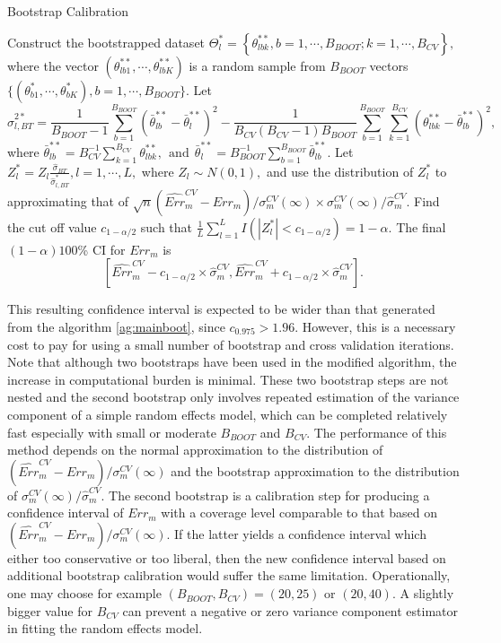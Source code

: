 \documentclass[12pt]{article}
\begin{document}
\begin{algorithm}[h!]
\caption{Bootstrap Calibration}\label{ag:calboot}
{\small
\begin{algorithmic}[1]
\setcounter{ALG@line}{12}
\State Construct the bootstrapped dataset
$\Theta_l^*=\left\{\theta^{**}_{lbk}, b=1,\cdots, B_{BOOT}; k=1, \cdots, B_{CV}\right\},$
where the vector  $(\theta^{**}_{lb1}, \cdots, \theta^{**}_{lbK})$ is a random sample from $B_{BOOT}$ vectors 
$\{(\theta^*_{b1}, \cdots, \theta^*_{bK}), b=1, \cdots, B_{BOOT}\}.$
\State Let
$$\hat{\sigma}_{l,BT}^{2*}=\frac{1}{B_{BOOT}-1}\sum_{b=1}^{B_{BOOT}} (\bar{\theta}^{**}_{lb}-\bar{\theta}^{**}_l)^2-\frac{1}{B_{CV}(B_{CV}-1)B_{BOOT}}\sum_{b=1}^{B_{BOOT}} \sum_{k=1}^{B_{CV}}(\theta^{**}_{lbk}-\bar{\theta}^{**}_{lb})^2,$$
where 
$\bar{\theta}_{lb}^{**}=B_{CV}^{-1}\sum_{k=1}^{B_{CV}} \theta^{**}_{lbk},~~\mbox{and}~~\bar{\theta}^{**}_l=B_{BOOT}^{-1}\sum_{b=1}^{B_{BOOT}} \bar{\theta}^{**}_{lb}.$
\EndFor
\State Let $Z_l^*=Z_l\frac{\widehat{\sigma}_{BT}}{\widehat{\sigma}_{l, BT}^{*}} , l=1, \cdots, L,$
where $Z_l\sim N(0, 1),$ and use the distribution of $Z_l^*$ to approximating that of  $\sqrt{n}(\widehat{Err}^{CV}_m-Err_m)/\sigma_m^{CV}(\infty) \times \sigma_{m}^{CV}(\infty)/\widehat{\sigma}_m^{CV}.$
\State Find the cut off value $c_{1-\alpha/2}$ such that $\frac{1}{L}\sum_{l=1}^L I\left(|Z_l^*|<c_{1-\alpha/2} \right)=1-\alpha.$
\State The final $(1-\alpha)100$\% CI for $Err_m$ is 
$$\left[\widehat{Err}^{CV}_m-c_{1-\alpha/2}\times \widehat{\sigma}_m^{CV},  \widehat{Err}^{CV}_m+c_{1-\alpha/2}\times \widehat{\sigma}_m^{CV} \right].$$
\end{algorithmic}
}
\end{algorithm}

This resulting confidence interval is expected to be wider than that generated from the algorithm \ref{ag:mainboot}, since $c_{0.975}>1.96.$  However, this is a necessary cost to pay for using a small number of bootstrap and cross validation iterations. Note that although two bootstraps have been used in the modified algorithm, the increase in computational burden is minimal. These two bootstrap steps are not nested and the second bootstrap only involves repeated estimation of the variance component of a simple random effects model, which can be completed relatively fast especially with small or moderate $B_{BOOT}$ and $B_{CV}.$ The performance of this method depends on the normal approximation to the distribution of $(\widehat{Err}_m^{CV}-Err_m)/\sigma_m^{CV}(\infty)$ and the bootstrap approximation to the distribution of $\sigma_m^{CV}(\infty)/\widehat{\sigma}_m^{CV}.$  The second bootstrap is a calibration step for producing a confidence interval of $Err_m$ with a coverage level comparable to that based on $(\widehat{Err}_m^{CV}-Err_m)/\sigma_m^{CV}(\infty)$. If the latter yields a confidence interval which either too conservative or too liberal, then the new confidence interval based on additional bootstrap calibration would suffer the same limitation. Operationally, one may choose for example $(B_{BOOT}, B_{CV})=(20, 25)$ or $(20, 40).$ A slightly bigger value for $B_{CV}$ can prevent a negative or zero variance component estimator in fitting the random effects model.
\end{document}
